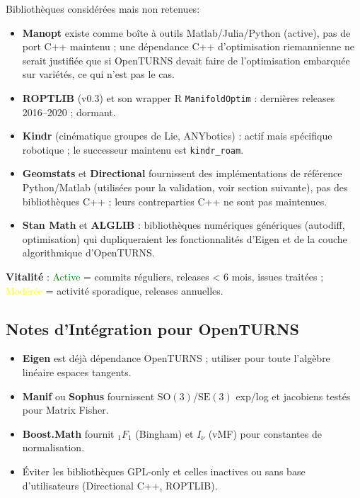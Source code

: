 \documentclass[11pt,a4paper]{article}
\begin{document}
Bibliothèques considérées mais non retenues:
\begin{itemize}
    \item \textbf{Manopt} existe comme boîte à outils Matlab/Julia/Python (active), pas de port C++ maintenu ; une dépendance C++ d'optimisation riemannienne ne serait justifiée que si OpenTURNS devait faire de l'optimisation embarquée sur variétés, ce qui n'est pas le cas.
    \item \textbf{ROPTLIB} ($\text{v}$0.3) et son wrapper R \texttt{ManifoldOptim} : dernières releases 2016--2020 ; dormant.
    \item \textbf{Kindr} (cinématique groupes de Lie, ANYbotics) : actif mais spécifique robotique ; le successeur maintenu est \texttt{kindr\_roam}.
    \item \textbf{Geomstats} et \textbf{Directional} fournissent des implémentations de référence Python/Matlab (utilisées pour la validation, voir section suivante), pas des bibliothèques C++ ; leurs contreparties C++ ne sont pas maintenues.
    \item \textbf{Stan Math} et \textbf{ALGLIB} : bibliothèques numériques génériques (autodiff, optimisation) qui dupliqueraient les fonctionnalités d'Eigen et de la couche algorithmique d'OpenTURNS.
\end{itemize}

\medskip
\noindent\textbf{Vitalité} : \textcolor{green}{Active} = commits réguliers, releases < 6 mois, issues traitées ; \textcolor{yellow}{Modérée} = activité sporadique, releases annuelles.

\subsection{Notes d'Intégration pour OpenTURNS}
\begin{itemize}
    \item \textbf{Eigen} est déjà dépendance OpenTURNS ; utiliser pour toute l'algèbre linéaire espaces tangents.
    \item \textbf{Manif} ou \textbf{Sophus} fournissent $\text{SO}(3)$/$\text{SE}(3)$ exp/log et jacobiens testés pour Matrix Fisher.
    \item \textbf{Boost.Math} fournit ${}_1F_1$ (Bingham) et $I_\nu$ (vMF) pour constantes de normalisation.
    \item Éviter les bibliothèques GPL-only et celles inactives ou sans base d'utilisateurs (Directional C++, ROPTLIB).
\end{itemize}
\end{document}
